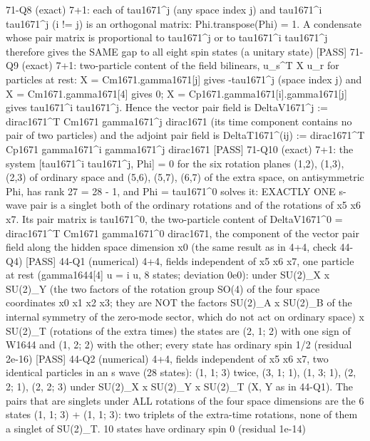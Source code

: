 \documentclass[
  10pt,
]{article}
\newenvironment{Shaded}{}{}
\newcommand{\NormalTok}[1]{#1}
\begin{document}
\begin{Shaded}
\begin{Highlighting}[]
\NormalTok{[PASS] 71{-}Q8  (exact) 7+1: each of tau1671\^{}j (any space index j) and tau1671\^{}i tau1671\^{}j (i != j) is an orthogonal matrix: Phi.transpose(Phi) = 1.  A condensate whose pair matrix is proportional to tau1671\^{}j or to tau1671\^{}i tau1671\^{}j therefore gives the SAME gap to all eight spin states (a \textquotesingle{}unitary\textquotesingle{} state)}
\NormalTok{[PASS] 71{-}Q9  (exact) 7+1: two{-}particle content of the field bilinears, u\_s\^{}T X u\_r for particles at rest: X = Cm1671.gamma1671[j] gives {-}tau1671\^{}j (space index j) and X = Cm1671.gamma1671[4] gives 0; X = Cp1671.gamma1671[i].gamma1671[j] gives tau1671\^{}i tau1671\^{}j.  Hence the vector pair field is DeltaV1671\^{}j := dirac1671\^{}T Cm1671 gamma1671\^{}j dirac1671 (its time component contains no pair of two particles) and the adjoint pair field is DeltaT1671\^{}(ij) := dirac1671\^{}T Cp1671 gamma1671\^{}i gamma1671\^{}j dirac1671}
\NormalTok{[PASS] 71{-}Q10 (exact) 7+1: the system [tau1671\^{}i tau1671\^{}j, Phi] = 0 for the six rotation planes (1,2), (1,3), (2,3) of ordinary space and (5,6), (5,7), (6,7) of the extra space, on antisymmetric Phi, has rank 27 = 28 {-} 1, and Phi = tau1671\^{}0 solves it: EXACTLY ONE s{-}wave pair is a singlet both of the ordinary rotations and of the rotations of x5 x6 x7.  Its pair matrix is tau1671\^{}0, the two{-}particle content of DeltaV1671\^{}0 = dirac1671\^{}T Cm1671 gamma1671\^{}0 dirac1671, the component of the vector pair field along the hidden space dimension x0 (the same result as in 4+4, check 44{-}Q4)}
\NormalTok{[PASS] 44{-}Q1  (numerical) 4+4, fields independent of x5 x6 x7, one particle at rest (gamma1644[4] u = i u, 8 states; deviation 0e0): under SU(2)\_X x SU(2)\_Y (the two factors of the rotation group SO(4) of the four space coordinates x0 x1 x2 x3; they are NOT the factors SU(2)\_A x SU(2)\_B of the internal symmetry of the zero{-}mode sector, which do not act on ordinary space) x SU(2)\_T (rotations of the extra times) the states are (2, 1; 2) with one sign of W1644 and (1, 2; 2) with the other; every state has ordinary spin 1/2 (residual 2e{-}16)}
\NormalTok{[PASS] 44{-}Q2  (numerical) 4+4, fields independent of x5 x6 x7, two identical particles in an s wave (28 states): (1, 1; 3) twice, (3, 1; 1), (1, 3; 1), (2, 2; 1), (2, 2; 3) under SU(2)\_X x SU(2)\_Y x SU(2)\_T (X, Y as in 44{-}Q1).  The pairs that are singlets under ALL rotations of the four space dimensions are the 6 states (1, 1; 3) + (1, 1; 3): two triplets of the extra{-}time rotations, none of them a singlet of SU(2)\_T.  10 states have ordinary spin 0 (residual 1e{-}14)}

\end{Highlighting}
\end{Shaded}
\end{document}
